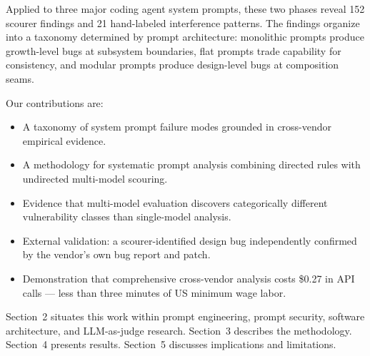 Applied to three major coding agent system prompts, these two phases
reveal 152 scourer findings and 21 hand-labeled interference patterns.
The findings organize into a taxonomy determined by prompt architecture:
monolithic prompts produce growth-level bugs at subsystem boundaries,
flat prompts trade capability for consistency, and modular prompts
produce design-level bugs at composition seams.

Our contributions are:

\begin{itemize}
\tightlist
\item
  A taxonomy of system prompt failure modes grounded in cross-vendor
  empirical evidence.
\item
  A methodology for systematic prompt analysis combining directed rules
  with undirected multi-model scouring.
\item
  Evidence that multi-model evaluation discovers categorically different
  vulnerability classes than single-model analysis.
\item
  External validation: a scourer-identified design bug independently
  confirmed by the vendor's own bug report and patch.
\item
  Demonstration that comprehensive cross-vendor analysis costs \$0.27 in
  API calls --- less than three minutes of US minimum wage labor.
\end{itemize}

Section~2 situates this work within prompt engineering, prompt security,
software architecture, and LLM-as-judge research. Section~3 describes
the methodology. Section~4 presents results. Section~5 discusses
implications and limitations.
